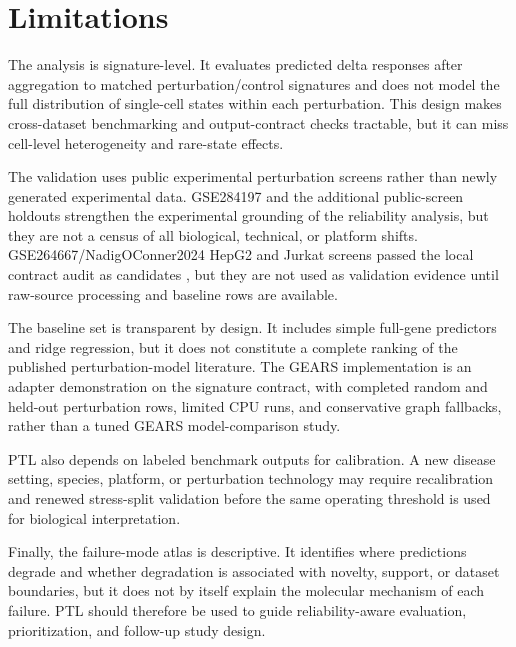 \section{Limitations}

The analysis is signature-level. It evaluates predicted delta responses after aggregation to matched perturbation/control signatures and does not model the full distribution of single-cell states within each perturbation. This design makes cross-dataset benchmarking and output-contract checks tractable, but it can miss cell-level heterogeneity and rare-state effects.

The validation uses public experimental perturbation screens rather than newly generated experimental data. GSE284197 and the additional public-screen holdouts strengthen the experimental grounding of the reliability analysis, but they are not a census of all biological, technical, or platform shifts. GSE264667/NadigOConner2024 HepG2 and Jurkat screens passed the local contract audit as candidates \citep{geo2024gse264667}, but they are not used as validation evidence until raw-source processing and baseline rows are available.

The baseline set is transparent by design. It includes simple full-gene predictors and ridge regression, but it does not constitute a complete ranking of the published perturbation-model literature. The GEARS implementation is an adapter demonstration on the signature contract, with completed random and held-out perturbation rows, limited CPU runs, and conservative graph fallbacks, rather than a tuned GEARS model-comparison study.

PTL also depends on labeled benchmark outputs for calibration. A new disease setting, species, platform, or perturbation technology may require recalibration and renewed stress-split validation before the same operating threshold is used for biological interpretation.

Finally, the failure-mode atlas is descriptive. It identifies where predictions degrade and whether degradation is associated with novelty, support, or dataset boundaries, but it does not by itself explain the molecular mechanism of each failure. PTL should therefore be used to guide reliability-aware evaluation, prioritization, and follow-up study design.
